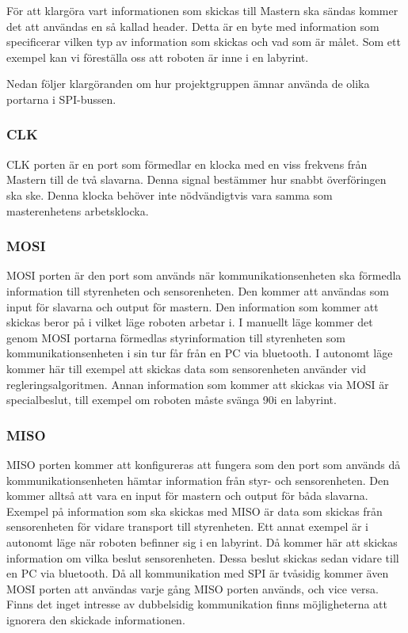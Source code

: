För att klargöra vart informationen som skickas till Mastern ska sändas kommer det att användas en så kallad header. Detta är en byte med information som specificerar vilken typ av information som skickas och vad som är målet. Som ett exempel kan vi föreställa oss att roboten är inne i en labyrint. 

Nedan följer klargöranden om hur projektgruppen ämnar använda de olika portarna i SPI-bussen. 


\subsubsection{CLK}

CLK porten är en port som förmedlar en klocka med en viss frekvens från Mastern till de två slavarna. Denna signal bestämmer hur snabbt överföringen ska ske. Denna klocka behöver inte nödvändigtvis vara samma som masterenhetens arbetsklocka. 

\subsubsection{MOSI}
MOSI porten är den port som används när kommunikationsenheten ska förmedla information till styrenheten och sensorenheten. Den kommer att användas som input för slavarna och output för mastern. Den information som kommer att skickas beror på i vilket läge roboten arbetar i. I manuellt läge kommer det genom MOSI portarna förmedlas styrinformation till styrenheten som kommunikationsenheten i sin tur får från en PC via bluetooth. I autonomt läge kommer här till exempel att skickas data som sensorenheten använder vid regleringsalgoritmen. Annan information som kommer att skickas via MOSI är specialbeslut, till exempel om roboten måste svänga 90\degree i en labyrint.

\subsubsection{MISO}
MISO porten kommer att konfigureras att fungera som den port som används då kommunikationsenheten hämtar information från styr- och sensorenheten. Den kommer alltså att vara en input för mastern och output för båda slavarna. Exempel på information som ska skickas med MISO är data som skickas från sensorenheten för vidare transport till styrenheten. Ett annat exempel är i autonomt läge när roboten befinner sig i en labyrint. Då kommer här att skickas information om vilka beslut sensorenheten. Dessa beslut skickas sedan vidare till en PC via bluetooth.
Då all kommunikation med SPI är tvåsidig kommer även MOSI porten att användas varje gång MISO porten används, och vice versa. Finns det inget intresse av dubbelsidig kommunikation finns möjligheterna att ignorera den skickade informationen.

